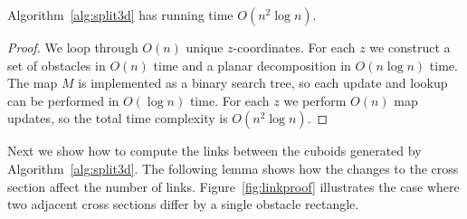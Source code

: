 \documentclass[english,gradu]{tktltiki2018}
\begin{document}
\begin{lem}\label{lem:split3dtime}Algorithm~\ref{alg:split3d} has running time $O(n^2\log n)$.\end{lem}
\begin{proof}
We loop through $O(n)$ unique $z$-coordinates.
For each $z$ we construct a set of obstacles in $O(n)$ time and a planar decomposition in $O(n\log n)$ time.
The map $M$ is implemented as a binary search tree, so each update and lookup can be performed in $O(\log n)$ time.
For each $z$ we perform $O(n)$ map updates, so the total time complexity is $O(n^2\log n)$.
\end{proof}

Next we show how to compute the links between the cuboids generated by Algorithm~\ref{alg:split3d}.
The following lemma shows how the changes to the cross section affect the number of links.
Figure~\ref{fig:linkproof} illustrates the case where two adjacent cross sections differ by a single obstacle rectangle.
\end{document}
